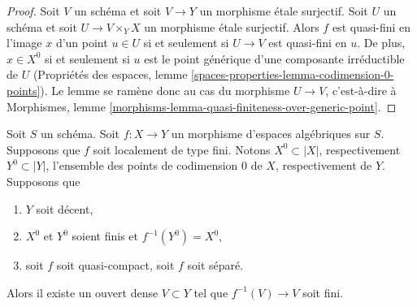 \begin{proof}
Soit $V$ un schéma et soit $V \to Y$ un morphisme étale surjectif.
Soit $U$ un schéma et soit $U \to V \times_Y X$ un morphisme étale
surjectif. Alors $f$ est quasi-fini en l'image $x$ d'un point $u \in U$
si et seulement si $U \to V$ est quasi-fini en $u$. De plus, $x \in X^0$
si et seulement si $u$ est le point générique d'une composante irréductible
de $U$ (Propriétés des espaces, lemme
\ref{spaces-properties-lemma-codimension-0-points}).
Le lemme se ramène donc au cas du morphisme $U \to V$, c'est-à-dire à
Morphismes, lemme
\ref{morphisms-lemma-quasi-finiteness-over-generic-point}.
\end{proof}

\begin{lemma}
\label{lemma-finite-over-dense-open}
Soit $S$ un schéma. Soit $f : X \to Y$ un morphisme d'espaces algébriques
sur $S$. Supposons que $f$ soit localement de type fini.
Notons $X^0 \subset |X|$, respectivement $Y^0 \subset |Y|$, l'ensemble des
points de codimension $0$ de $X$, respectivement de $Y$. Supposons que
\begin{enumerate}
\item $Y$ soit décent,
\item $X^0$ et $Y^0$ soient finis et $f^{-1}(Y^0) = X^0$,
\item soit $f$ soit quasi-compact, soit $f$ soit séparé.
\end{enumerate}
Alors il existe un ouvert dense $V \subset Y$ tel que
$f^{-1}(V) \to V$ soit fini.
\end{lemma}

